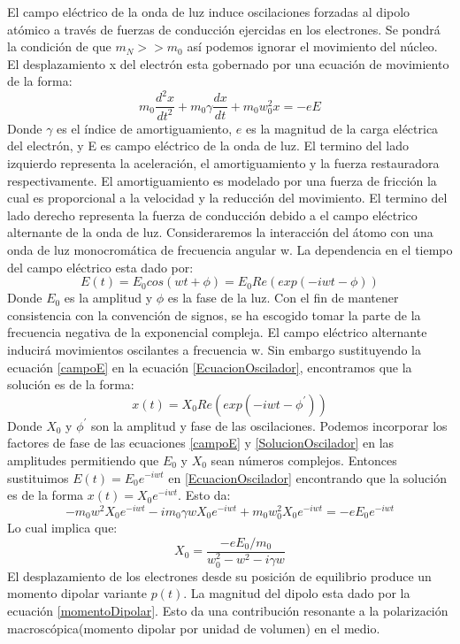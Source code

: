 \documentclass[a4paper,openright,12pt]{book}
\begin{document}
El campo eléctrico de la onda de luz induce oscilaciones forzadas al dipolo atómico a través de fuerzas de conducción ejercidas en los electrones. Se pondrá la condición de que $m_{N}>>m_{0}$ así podemos ignorar el movimiento del núcleo. El desplazamiento x del electrón esta gobernado por una ecuación de movimiento de la forma:
\begin{equation}\label{EcuacionOscilador}
m_{0}\frac{d^{2}x}{dt^{2}}+m_{0}\gamma\frac{dx}{dt}+m_{0}w_{0}^{2}x=-eE
\end{equation}
Donde $\gamma$ es el índice de amortiguamiento, $e$ es la magnitud de la carga eléctrica del electrón, y E es campo eléctrico de la onda de luz. El termino del lado izquierdo representa la aceleración, el amortiguamiento y la fuerza restauradora respectivamente. El amortiguamiento es modelado por una fuerza de fricción la cual es proporcional a la velocidad y la reducción del movimiento. El termino del lado derecho representa la fuerza de conducción debido a el campo eléctrico alternante de la onda de luz.
Consideraremos la interacción del átomo con una onda de luz monocromática de frecuencia angular w. La dependencia en el tiempo del campo eléctrico esta dado por:
\begin{equation}\label{campoE}
E(t)=E_{0}cos(wt+\phi)=E_{0}Re(exp(-iwt-\phi))
\end{equation}
Donde $E_{0}$ es la amplitud y $\phi$ es la fase de la luz. Con el fin de mantener consistencia con la convención de signos, se ha escogido tomar la parte de la frecuencia negativa de la exponencial compleja.
El campo eléctrico alternante inducirá movimientos oscilantes a frecuencia w. Sin embargo sustituyendo la ecuación \ref{campoE} en la ecuación \ref{EcuacionOscilador}, encontramos que la solución es de la forma:
\begin{equation}\label{SolucionOscilador}
x(t)=X_{0}Re(exp(-iwt-\phi^{'}))
\end{equation}
Donde $X_{0}$ y $\phi^{'}$ son la amplitud y fase de las oscilaciones. Podemos incorporar los factores de fase de las ecuaciones \ref{campoE} y \ref{SolucionOscilador} en las amplitudes permitiendo que $E_{0}$ y $X_{0}$ sean números complejos. Entonces sustituimos $E(t)=E_{0}e^{-iwt}$ en \ref{EcuacionOscilador} encontrando que la solución es de la forma $x(t)=X_{0}e^{-iwt}$. Esto da:
\begin{equation}
-m_{0}w^{2}X_{0}e^{-iwt}-im_{0}\gamma wX_{0}e^{-iwt}+m_{0}w_{0}^{2}X_{0}e^{-iwt}=-eE_{0}e^{-iwt}
\end{equation}
Lo cual implica que:
\begin{equation}
X_{0}=\frac{-e E_{0}/m_{0}}{w_{0}^{2}-w^{2}-i\gamma w}
\end{equation}
El desplazamiento de los electrones desde su posición de equilibrio produce un momento dipolar variante $p(t)$. La magnitud del dipolo esta dado por la ecuación \ref{momentoDipolar}. Esto da una contribución resonante a la polarización macroscópica(momento dipolar por unidad de volumen) en el medio.
\end{document}
